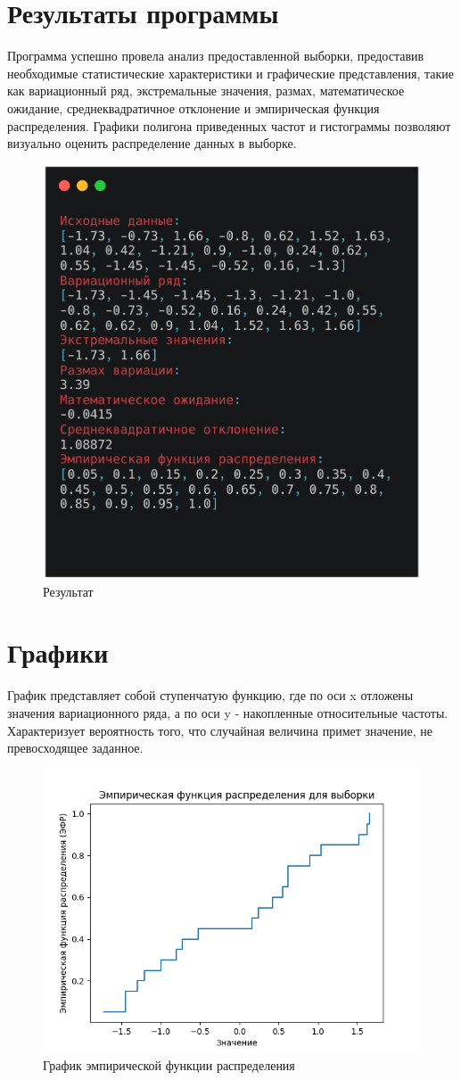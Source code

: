 \documentclass[14pt]{extreport}
\begin{document}
        \section{Результаты программы}
            Программа успешно провела анализ предоставленной выборки, предоставив необходимые статистические характеристики и графические представления, такие как вариационный ряд, экстремальные значения, размах, математическое ожидание, среднеквадратичное отклонение и эмпирическая функция распределения. Графики полигона приведенных частот и гистограммы позволяют визуально оценить распределение данных в выборке.
            \begin{figure}[!h]
                \centering
                \includegraphics[width=0.5\linewidth]{result.png}
                \caption{Результат }
            \end{figure}

        \section{Графики}
            График представляет собой ступенчатую функцию, где по оси x отложены значения вариационного ряда, а по оси y - накопленные относительные частоты. Характеризует вероятность того, что случайная величина примет значение, не превосходящее заданное.
            \begin{figure}[!h]
                \centering
                \includegraphics[width=0.3\linewidth]{graph1.png}
                \caption{График эмпирической функции распределения}
            \end{figure}
\end{document}
